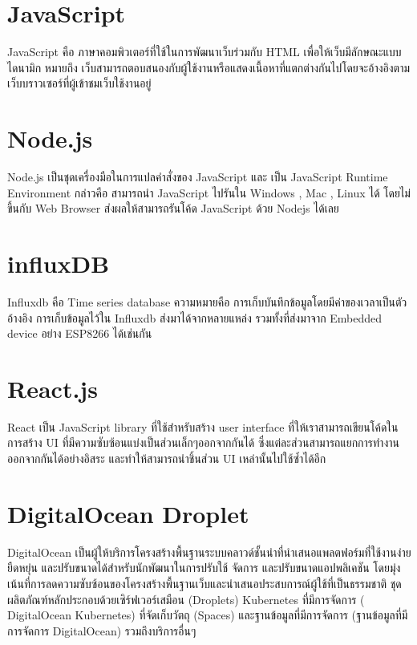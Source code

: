 \section{JavaScript}
\cite[JavaScript]{javascript} JavaScript คือ ภาษาคอมพิวเตอร์ที่ใช้ในการพัฒนาเว็บร่วมกับ HTML เพื่อให้เว็บมีลักษณะแบบไดนามิก หมายถึง เว็บสามารถตอบสนองกับผู้ใช้งานหรือแสดงเนื้อหาที่แตกต่างกันไปโดยจะอ้างอิงตามเว็บบราวเซอร์ที่ผู้เข้าชมเว็บใช้งานอยู่

\section{Node.js}
\cite[โปรโตคอลการส่งข้อมูล HTTP]{nodejs} Node.js เป็นชุดเครื่องมือในการแปลคำสั่งของ JavaScript และ เป็น JavaScript Runtime Environment กล่าวคือ สามารถนำ JavaScript ไปรันใน Windows , Mac , Linux ได้ โดยไม่ขึ้นกับ Web Browser ส่งผลให้สามารถรันโค้ด JavaScript ด้วย Nodejs ได้เลย

\section{influxDB}
\cite[โปรโตคอลการส่งข้อมูล HTTP]{influxdb} Influxdb คือ Time series database ความหมายคือ การเก็บบันทึกข้อมูลโดยมีค่าของเวลาเป็นตัวอ้างอิง การเก็บข้อมูลไว้ใน Influxdb ส่งมาได้จากหลายแหล่ง รวมทั้งที่ส่งมาจาก Embedded device อย่าง ESP8266 ได้เช่นกัน

\section{React.js}
\cite[โปรโตคอลการส่งข้อมูล HTTP]{react} React เป็น JavaScript library ที่ใช้สำหรับสร้าง user interface ที่ให้เราสามารถเขียนโค้ดในการสร้าง UI ที่มีความซับซ้อนแบ่งเป็นส่วนเล็กๆออกจากกันได้ ซึ่งแต่ละส่วนสามารถแยกการทำงานออกจากกันได้อย่างอิสระ และทำให้สามารถนำชิ้นส่วน UI เหล่านั้นไปใช้ซ้ำได้อีก

\section{DigitalOcean Droplet}
\cite[โปรโตคอลการส่งข้อมูล HTTP]{digitalocean} DigitalOcean เป็นผู้ให้บริการโครงสร้างพื้นฐานระบบคลาวด์ชั้นนำที่นำเสนอแพลตฟอร์มที่ใช้งานง่าย ยืดหยุ่น และปรับขนาดได้สำหรับนักพัฒนาในการปรับใช้ จัดการ และปรับขนาดแอปพลิเคชัน โดยมุ่งเน้นที่การลดความซับซ้อนของโครงสร้างพื้นฐานเว็บและนำเสนอประสบการณ์ผู้ใช้ที่เป็นธรรมชาติ ชุดผลิตภัณฑ์หลักประกอบด้วยเซิร์ฟเวอร์เสมือน (Droplets) Kubernetes ที่มีการจัดการ ( DigitalOcean Kubernetes) ที่จัดเก็บวัตถุ (Spaces) และฐานข้อมูลที่มีการจัดการ (ฐานข้อมูลที่มีการจัดการ DigitalOcean) รวมถึงบริการอื่นๆ

